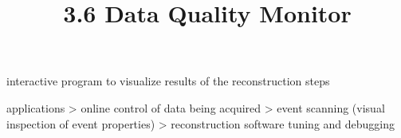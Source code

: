 

\newpage%
\title{3.6 Data Quality Monitor}

\> interactive program to visualize results of the reconstruction steps

\> applications
\>> online control of data being acquired
\>> event scanning (visual inspection of event properties)
\>> reconstruction software tuning and debugging



\bye
